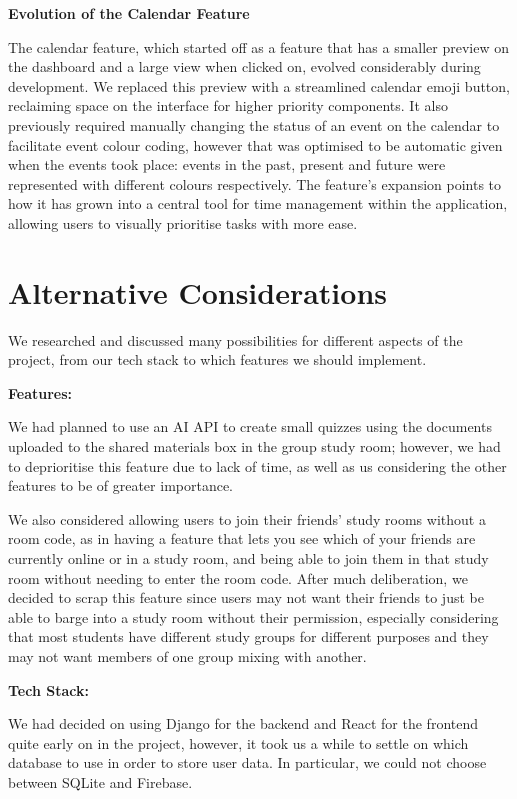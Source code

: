 \textbf{Evolution of the Calendar Feature}

The calendar feature, which started off as a feature that has a smaller preview on the dashboard and a large view when clicked on, evolved considerably during development. We replaced this preview with a streamlined calendar emoji button, reclaiming space on the interface for higher priority components. It also previously required manually changing the status of an event on the calendar to facilitate event colour coding, however that was optimised to be automatic given when the events took place: events in the past, present and future were represented with different colours respectively. The feature's expansion points to how it has grown into a central tool for time management within the application, allowing users to visually prioritise tasks with more ease.

\section{Alternative Considerations}
\label{sect:alternative-considerations}
We researched and discussed many possibilities for different aspects of the project, from our tech stack to which features we should implement.

\textbf{Features:}

We had planned to use an AI API to create small quizzes using the documents uploaded to the shared materials box in the group study room; however, we had to deprioritise this feature due to lack of time, as well as us considering the other features to be of greater importance.

We also considered allowing users to join their friends' study rooms without a room code, as in having a feature that lets you see which of your friends are currently online or in a study room, and being able to join them in that study room without needing to enter the room code. After much deliberation, we decided to scrap this feature since users may not want their friends to just be able to barge into a study room without their permission, especially considering that most students have different study groups for different purposes and they may not want members of one group mixing with another.


\textbf{Tech Stack:}

We had decided on using Django for the backend and React for the frontend quite early on in the project, however, it took us a while to settle on which database to use in order to store user data. In particular, we could not choose between SQLite and Firebase. 

